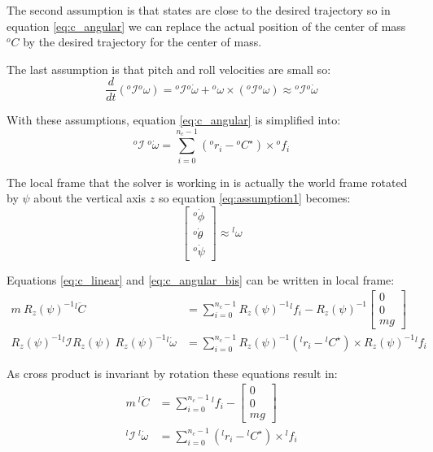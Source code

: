 \documentclass[a4paper,11pt]{article}
\begin{document}
The second assumption is that states are close to the desired trajectory so in equation \ref{eq:c_angular} we can replace the actual position of the center of mass ${}^o\!C$ by the desired trajectory for the center of mass.

The last assumption is that pitch and roll velocities are small so:
\begin{equation}
	\frac{d}{dt}({}^o\!\mathcal{I} {}^o\!\omega) = {}^o\!\mathcal{I} {}^o\! \dot \omega + {}^o\! \omega \times ({}^o\!\mathcal{I} {}^o\! \omega) \approx {}^o\!\mathcal{I} {}^o\! \dot \omega
\end{equation}

With these assumptions, equation \ref{eq:c_angular} is simplified into:
\begin{equation}
{}^o\!\mathcal{I} ~ {}^o\! \dot \omega = \sum_{i=0}^{n_c - 1} ({}^o\!r_i - {}^o\!C^\star) \times {}^o\!f_i \label{eq:c_angular_bis}
\end{equation}

The local frame that the solver is working in is actually the world frame rotated by $\psi$ about the vertical axis $z$ so equation \ref{eq:assumption1} becomes:
\begin{equation}
\begin{bmatrix} {}^o\! \dot \phi \\ {}^o\! \dot \theta \\ {}^o\! \dot \psi \end{bmatrix} \approx {}^l\!\omega 
\end{equation}

Equations \ref{eq:c_linear} and \ref{eq:c_angular_bis} can be written in local frame:
\begin{align}
m ~ R_z(\psi)^{-1} {}^l\!  \ddot C &= \sum_{i=0}^{n_c - 1} R_z(\psi)^{-1} {}^l\!f_i - R_z(\psi)^{-1} \begin{bmatrix} 0 \\ 0 \\ mg \end{bmatrix} \\
R_z(\psi)^{-1} {}^l\!\mathcal{I} R_z(\psi) ~ R_z(\psi)^{-1} {}^l\! \dot \omega &= \sum_{i=0}^{n_c - 1} R_z(\psi)^{-1} ({}^l\!r_i - {}^l\!C^\star) \times R_z(\psi)^{-1} {}^l\!f_i
\end{align}

As cross product is invariant by rotation these equations result in:
\begin{align}
m ~ {}^l\!  \ddot C &= \sum_{i=0}^{n_c - 1} {}^l\!f_i - \begin{bmatrix} 0 \\ 0 \\ mg \end{bmatrix} \\
{}^l\!\mathcal{I} ~ {}^l\! \dot \omega &= \sum_{i=0}^{n_c - 1} ({}^l\!r_i - {}^l\!C^\star) \times {}^l\!f_i
\end{align}
\end{document}
